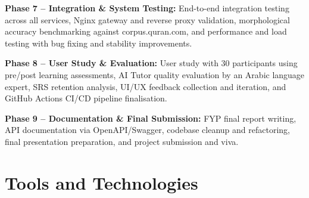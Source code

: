 \documentclass[A4paper,12pt]{article}
\begin{document}
\textbf{Phase 7 -- Integration \& System Testing:} End-to-end
integration testing across all services, Nginx gateway and reverse proxy validation,
morphological accuracy benchmarking against corpus.quran.com, and performance and load
testing with bug fixing and stability improvements.

\textbf{Phase 8 -- User Study \& Evaluation:} User study with 30
participants using pre/post learning assessments, AI Tutor quality evaluation by an Arabic
language expert, SRS retention analysis, UI/UX feedback collection and iteration, and
GitHub Actions CI/CD pipeline finalisation.

\textbf{Phase 9 -- Documentation \& Final Submission:} FYP final
report writing, API documentation via OpenAPI/Swagger, codebase cleanup and refactoring,
final presentation preparation, and project submission and viva.
\section{Tools and Technologies}
\end{document}
